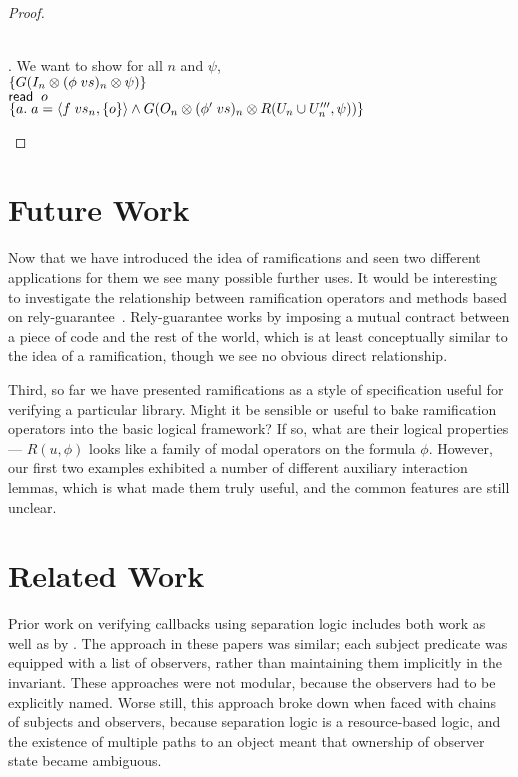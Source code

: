 \begin{proof}
\begin{enumerate}
\begin{tabbedproof}
  \\ . We want to show for all $n$ and $\psi$, \\
  \ooox $\{{G(I_n \otimes (\phi\;vs)_n \otimes \psi)}\}$ \\
  \ooox $\mathsf{read}\;\;o$ \\
  \ooox $\{{a.\;a = \left<{f\;vs_n},{\{{o}\}}\right> \land G(O_n \otimes (\phi'\;vs)_n \otimes R(U_n \cup U'''_n, \psi))}\}$ \\

  \end{tabbedproof}
\end{enumerate}
\end{proof}

\section{Future Work}

Now that we have introduced the idea of ramifications and seen two
different applications for them we see many possible further uses.  It
would be interesting to investigate the relationship between
ramification operators and methods based on
rely-guarantee~\cite{rely-guarantee-jones}. Rely-guarantee works by
imposing a mutual contract between a piece of code and the rest of the
world, which is at least conceptually similar to the idea of a
ramification, though we see no obvious direct relationship.

Third, so far we have presented ramifications as a style of
specification useful for verifying a particular library.  Might it be
sensible or useful to bake ramification operators into the basic
logical framework?  If so, what are their logical properties --- $R(u,
\phi)$ looks like a family of modal operators on the formula $\phi$.
However, our first two examples exhibited a number of different
auxiliary interaction lemmas, which is what made them truly useful, 
and the common features are still unclear. 

\section{Related Work}

Prior work on verifying callbacks using separation logic includes both
\citet{tldi09,ftfjp07} work as well as by
\citet{parkinson-iwaco-07}. The approach in these papers was similar;
each subject predicate was equipped with a list of observers, rather
than maintaining them implicitly in the invariant. These approaches
were not modular, because the observers had to be explicitly
named. Worse still, this approach broke down when faced with chains of
subjects and observers, because separation logic is a resource-based
logic, and the existence of multiple paths to an object meant that
ownership of observer state became ambiguous.

